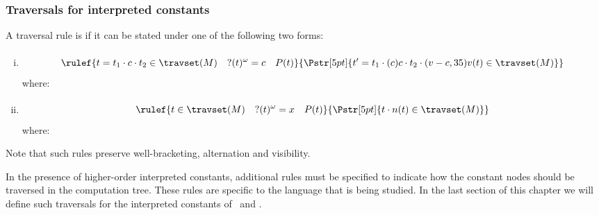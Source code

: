 \subsubsection{Traversals for interpreted constants}

\begin{definition}
\label{def:wellbehaved_traversal} A traversal rule is
 if it can be stated under one of the following two forms:
\begin{enumerate}[(i)]
\item 
    $$\rulef{t = t_1\cdot c \cdot t_2 \in \travset(M) \quad ?(t)^\omega = c \quad P(t)}
      { \stackrel{  \rule{0pt}{3pt} }{\Pstr[5pt]{ t' = t_1\cdot (c){c} \cdot t_2 \cdot (v-c,35){v(t)} \in {\travset(M)}}}
             }
       $$
    where:

\item 
$$\rulef{t \in \travset(M) \quad ?(t)^\omega = x \quad P(t)}
  { \stackrel{  \rule{0pt}{3pt} }{\Pstr[5pt]{ t \cdot {n(t)} \in {\travset(M)}}}
   }$$
where:
\end{enumerate}
Note that such rules preserve well-bracketing, alternation and visibility.
\end{definition}

In the presence of higher-order interpreted constants, additional rules must be specified to indicate how
the constant nodes should be traversed in the computation tree. These rules
are specific to the language that is being studied.
In the last section of this chapter we will define such traversals for the interpreted constants of
\pcf\ and \ialgol.


